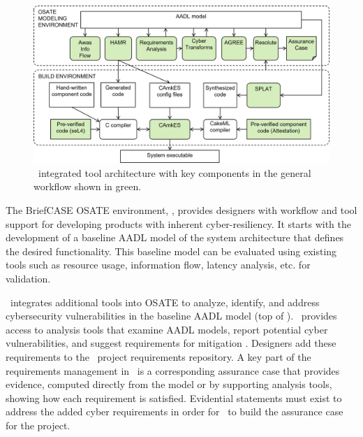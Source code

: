 \begin{figure}
	\begin{center}
	  \includegraphics[width=\textwidth]{./figs/tool-arch.jpg}
  	\end{center}
	\caption{\brfcs\ integrated tool architecture with key components in the general workflow shown in green.} 
	\label{fig:tool-arch} 
\end{figure}

The BriefCASE OSATE environment, , provides designers with workflow and tool support for developing products with inherent cyber-resiliency.
It starts with the development of a baseline AADL model of the system architecture that defines the desired functionality.
This baseline model can be evaluated using existing tools such as resource usage, information flow, latency analysis, etc. for validation.

\brfcs\ integrates additional tools into OSATE to analyze, identify, and address cybersecurity vulnerabilities in the baseline AADL model (top of ).
\brfcs\ provides access to analysis tools that examine AADL models, report potential cyber vulnerabilities,
and suggest requirements for mitigation \cite{dcrypps2019,gearcase2020}.
Designers add these requirements to the \brfcs\ project requirements repository. 
A key part of the requirements management in \brfcs\ is a corresponding assurance case that provides evidence, computed directly from the model or by supporting analysis tools, showing how each requirement is satisfied.
Evidential statements must exist to address the added cyber requirements in order for \brfcs\ to build the assurance case for the project.

